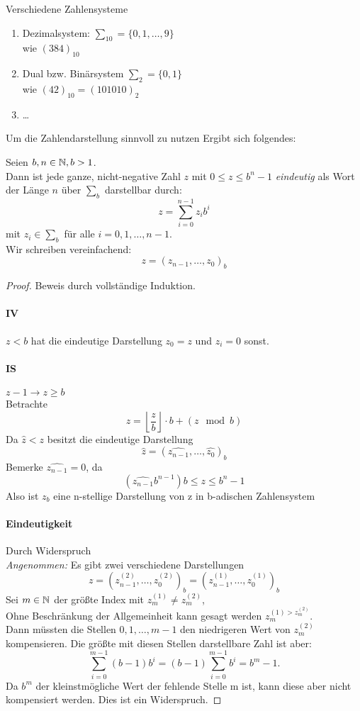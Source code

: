 \begin{example}
Verschiedene Zahlensysteme
\begin{enumerate}
	\item Dezimalsystem: $\sum_{10}= \{0,1,\ldots,9\}$ \\ wie $(384)_10$
	\item Dual bzw. Binärsystem $\sum_2 = \{0,1\}$ \\ wie $(42)_10 = (101010)_2$
	\item \ldots
\end{enumerate}
\end{example}
Um die Zahlendarstellung sinnvoll zu nutzen Ergibt sich folgendes:
\begin{theorem}[]
Seien $b,n \in  \mathbb{N}, b>1 $. \\
Dann ist jede ganze, nicht-negative Zahl $z$ mit $0\le z \le b^{n}-1$ \emph{eindeutig} als Wort der Länge $n$ über $\sum_b$ darstellbar durch:
\[
z=\sum_{i=0}^{n-1}z_ib^{i}
\]
mit $z_i \in \sum_b$ für alle $i=0,1,\ldots,n-1$. \\
Wir schreiben vereinfachend: 
\[
z=(z_{n-1},\ldots, z_0)_b
\]
\end{theorem}
\begin{proof}

Beweis durch vollständige Induktion.\\
\paragraph{IV} \underline{$z<b$} hat die eindeutige Darstellung $z_0=z$ und $z_i=0$ sonst.
\paragraph{IS} \underline{$z-1 \to z\ge b$} \\
Betrachte
\[
z= \left\lfloor{\frac{z}{b}}\right\rfloor \cdot b + (z \mod b)
\]
Da $\hat{z}<z$ besitzt die eindeutige Darstellung
\[
\hat{z}= (\hat{z_{n-1}},\ldots, \hat{z_0})_b
\]
Bemerke $\hat{z_{n-1}}=0$, da 
\[
\left( \hat{z_{n-1}}b^{n-1} \right)b \le z \le b^{n}-1
\]
Also ist $z_b$ eine n-stellige Darstellung von z in b-adischen Zahlensystem
\paragraph{Eindeutigkeit} Durch Widerspruch \\
\emph{Angenommen:} Es gibt zwei verschiedene Darstellungen
\[
z=\left( z_{n-1}^{(2)},\ldots, z_0^{(2)} \right)_b = \left(z_{n-1}^{(1)},\ldots,z_0^{(1)} \right)_b
\]
Sei $m \in  \mathbb{N}$ der größte Index mit $z_m^{(1)} \neq z_m^{(2)}$, \\
Ohne Beschränkung der Allgemeinheit kann gesagt werden $z_m^{(1)>z_m^{(2)}}$. \\
Dann müssten die Stellen $0,1,\ldots,m-1$ den niedrigeren Wert von $z_m^{(2)}$ kompensieren. Die größte mit diesen Stellen darstellbare Zahl ist aber:
\[
\sum_{i=0}^{m-1}(b-1)b^{i}= (b-1)\sum_{i=0}^{m-1}b^{i}= b^{m}-1 \text{.}
\]
Da $b^{m}$ der kleinstmögliche Wert der fehlende Stelle m ist, kann diese aber nicht kompensiert werden. Dies ist ein Widerspruch.
\end{proof}%
